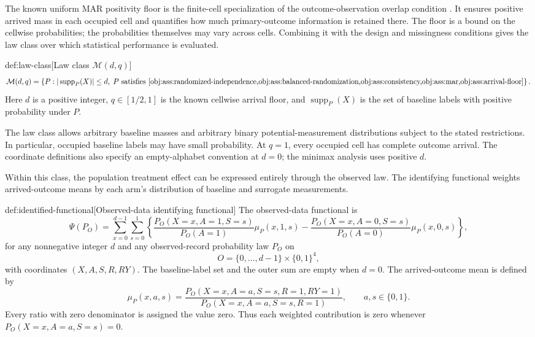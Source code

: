 \documentclass[11pt]{article}
\begin{document}
The known uniform MAR positivity floor is the finite-cell specialization of the outcome-observation overlap condition \citep{KallusMao2025}. It ensures positive arrived mass in each occupied cell and quantifies how much primary-outcome information is retained there. The floor is a bound on the cellwise probabilities; the probabilities themselves may vary across cells. Combining it with the design and missingness conditions gives the law class over which statistical performance is evaluated.

\begin{definitionv}{def:law-class}[Law class \(\mathcal M(d,q)\)]
\[
\mathcal M(d,q)
=
\left\{
P:
|\operatorname{supp}_P(X)|\le d,\;
P\text{ satisfies }
\cref{obj:ass:randomized-independence,obj:ass:balanced-randomization,obj:ass:consistency,obj:ass:mar,obj:ass:arrival-floor}
\right\}.
\]
Here \(d\) is a positive integer, \(q\in[1/2,1]\) is the known cellwise arrival floor, and \(\operatorname{supp}_P(X)\) is the set of baseline labels with positive probability under \(P\).
\end{definitionv}

The law class  allows arbitrary baseline masses and arbitrary binary potential-measurement distributions subject to the stated restrictions. In particular, occupied baseline labels may have small probability. At \(q=1\), every occupied cell has complete outcome arrival. The coordinate definitions also specify an empty-alphabet convention at \(d=0\); the minimax analysis uses positive \(d\).

Within this class, the population treatment effect can be expressed entirely through the observed law. The identifying functional weights arrived-outcome means by each arm's distribution of baseline and surrogate measurements.

\begin{definitionv}{def:identified-functional}[Observed-data identifying functional]
The observed-data functional is
\[
\Psi(P_O)
=
\sum_{x=0}^{d-1}\sum_{s=0}^{1}
\left\{
\frac{P_O(X=x,A=1,S=s)}{P_O(A=1)}\mu_P(x,1,s)
-
\frac{P_O(X=x,A=0,S=s)}{P_O(A=0)}\mu_P(x,0,s)
\right\},
\]
for any nonnegative integer \(d\) and any observed-record probability law \(P_O\) on
\[
O=\{0,\ldots,d-1\}\times\{0,1\}^{4},
\]
with coordinates \((X,A,S,R,RY)\). The baseline-label set and the outer sum are empty when \(d=0\). The arrived-outcome mean is defined by
\[
\mu_P(x,a,s)
=
\frac{P_O(X=x,A=a,S=s,R=1,RY=1)}
     {P_O(X=x,A=a,S=s,R=1)},
\qquad a,s\in\{0,1\}.
\]
Every ratio with zero denominator is assigned the value zero. Thus each weighted contribution is zero whenever \(P_O(X=x,A=a,S=s)=0\).
\end{definitionv}
\end{document}
